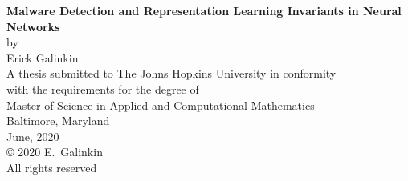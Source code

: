 \thispagestyle{empty}
\baselineskip=18pt
\begin{center}
\vspace*{3\baselineskip}
%
{\bfseries Malware Detection and Representation Learning Invariants in Neural Networks}\\[6\baselineskip]
%
by\\
%
Erick Galinkin\\[3\baselineskip]
%
%
A thesis submitted to The Johns Hopkins University in conformity\\
with the requirements for the degree of \\
Master of Science in Applied and Computational Mathematics\\[4\baselineskip]
%
Baltimore, Maryland\\
June, 2020\\[6\baselineskip]
%
{\copyright{} 2020 E.~Galinkin\\
All rights reserved}
%
\end{center}
%
\baselineskip=24pt
\newpage 
